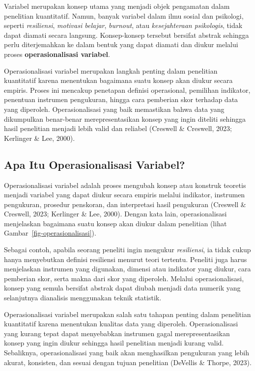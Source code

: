 \documentclass[
  indonesian,
  letterpaper,
  DIV=11,
  numbers=noendperiod]{scrreprt}
\begin{document}
Variabel merupakan konsep utama yang menjadi objek pengamatan dalam
penelitian kuantitatif. Namun, banyak variabel dalam ilmu sosial dan
psikologi, seperti \emph{resiliensi}, \emph{motivasi belajar},
\emph{burnout}, atau \emph{kesejahteraan psikologis}, tidak dapat
diamati secara langsung. Konsep-konsep tersebut bersifat abstrak
sehingga perlu diterjemahkan ke dalam bentuk yang dapat diamati dan
diukur melalui proses \textbf{operasionalisasi variabel}.

Operasionalisasi variabel merupakan langkah penting dalam penelitian
kuantitatif karena menentukan bagaimana suatu konsep akan diukur secara
empiris. Proses ini mencakup penetapan definisi operasional, pemilihan
indikator, penentuan instrumen pengukuran, hingga cara pemberian skor
terhadap data yang diperoleh. Operasionalisasi yang baik memastikan
bahwa data yang dikumpulkan benar-benar merepresentasikan konsep yang
ingin diteliti sehingga hasil penelitian menjadi lebih valid dan
reliabel (Creswell \& Creswell, 2023; Kerlinger \& Lee, 2000).

\subsection{Apa Itu Operasionalisasi
Variabel?}\label{apa-itu-operasionalisasi-variabel}

Operasionalisasi variabel adalah proses mengubah konsep atau konstruk
teoretis menjadi variabel yang dapat diukur secara empiris melalui
indikator, instrumen pengukuran, prosedur penskoran, dan interpretasi
hasil pengukuran (Creswell \& Creswell, 2023; Kerlinger \& Lee, 2000).
Dengan kata lain, operasionalisasi menjelaskan bagaimana suatu konsep
akan diukur dalam penelitian (lihat Gambar~\ref{fig-operasionalisasi}).

Sebagai contoh, apabila seorang peneliti ingin mengukur
\emph{resiliensi}, ia tidak cukup hanya menyebutkan definisi resiliensi
menurut teori tertentu. Peneliti juga harus menjelaskan instrumen yang
digunakan, dimensi atau indikator yang diukur, cara pemberian skor,
serta makna dari skor yang diperoleh. Melalui operasionalisasi, konsep
yang semula bersifat abstrak dapat diubah menjadi data numerik yang
selanjutnya dianalisis menggunakan teknik statistik.

Operasionalisasi variabel merupakan salah satu tahapan penting dalam
penelitian kuantitatif karena menentukan kualitas data yang diperoleh.
Operasionalisasi yang kurang tepat dapat menyebabkan instrumen gagal
merepresentasikan konsep yang ingin diukur sehingga hasil penelitian
menjadi kurang valid. Sebaliknya, operasionalisasi yang baik akan
menghasilkan pengukuran yang lebih akurat, konsisten, dan sesuai dengan
tujuan penelitian (DeVellis \& Thorpe, 2023).
\end{document}

